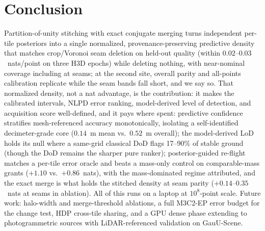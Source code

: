 
\section{Conclusion}
\label{sec:conclusion}

 Partition-of-unity stitching with exact conjugate merging turns
independent per-tile posteriors into a single normalized,
provenance-preserving predictive density that matches crop/Voronoi
seam deletion on held-out quality (within $0.02$--$0.03$~nats/point on
three H3D epochs) while deleting nothing, with near-nominal coverage
including at seams; at the second site, overall parity and all-points
calibration replicate while the seam bands fall short, and we say so.
That normalized density, not a nat advantage, is
the contribution: it makes the calibrated intervals, NLPD error
ranking, model-derived level of detection, and acquisition score
well-defined, and it pays where spent: predictive confidence
stratifies mesh-referenced accuracy monotonically, isolating a
self-identified decimeter-grade core ($0.14$~m mean vs.\ $0.52$~m
overall); the model-derived LoD holds its null where a same-grid
classical DoD flags 17--90\% of stable ground (though the DoD remains
the sharper pure ranker); posterior-guided
re-flight
matches a per-tile error oracle and beats a mass-only control on
comparable-mass grants ($+1.10$ vs.\ $+0.86$~nats), with the
mass-dominated regime attributed, and the exact merge is what holds
the stitched density at seam parity ($+0.14$--$0.35$~nats at seams in
ablation). All of this runs on a laptop at $10^{8}$-point
scale. Future work: halo-width and merge-threshold
ablations, a full M3C2-EP error budget for the change test, HDP
cross-tile sharing, and a GPU dense phase extending to
photogrammetric sources with LiDAR-referenced validation on
GauU-Scene.
